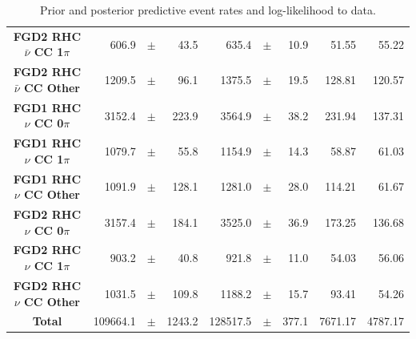 \begin{center}
\begin{table}
\begin{adjustbox}{max width=1.1\textwidth,center}
\begin{tabular}{S||
                r
                p{0.26cm}
                r
                |r
                p{0.26cm}
                r
                |r
                r}
\textbf{FGD2 RHC $\bar{\nu}$ CC 1$\pi$} & 606.9& $\pm$ &43.5 & 635.4& $\pm$ &10.9 & 51.55 & 55.22\\
\textbf{FGD2 RHC $\bar{\nu}$ CC Other} & 1209.5& $\pm$ &96.1 & 1375.5& $\pm$ &19.5 & 128.81 & 120.57\\ \hline
\textbf{FGD1 RHC $\nu$ CC 0$\pi$} & 3152.4& $\pm$ &223.9 & 3564.9& $\pm$ &38.2 & 231.94 & 137.31\\
\textbf{FGD1 RHC $\nu$ CC 1$\pi$} & 1079.7& $\pm$ &55.8 & 1154.9& $\pm$ &14.3 & 58.87 & 61.03\\
\textbf{FGD1 RHC $\nu$ CC Other} & 1091.9& $\pm$ &128.1 & 1281.0& $\pm$ &28.0 & 114.21 & 61.67\\ \hline
\textbf{FGD2 RHC $\nu$ CC 0$\pi$} & 3157.4& $\pm$ &184.1 & 3525.0& $\pm$ &36.9 & 173.25 & 136.68\\
\textbf{FGD2 RHC $\nu$ CC 1$\pi$} & 903.2& $\pm$ &40.8 & 921.8& $\pm$ &11.0 & 54.03 & 56.06\\
\textbf{FGD2 RHC $\nu$ CC Other} &   1031.5& $\pm$ &109.8 & 1188.2& $\pm$ &15.7 & 93.41 & 54.26\\ \hline
\textbf{Total} & 109664.1& $\pm$ &1243.2 & 128517.5& $\pm$ &377.1 & 7671.17 & 4787.17 \\ \hline\hline
\end{tabular}
\end{adjustbox}
\caption{Prior and posterior predictive event rates and log-likelihood to data.}
\label{tab:predrates}
\end{table}
\end{center}

